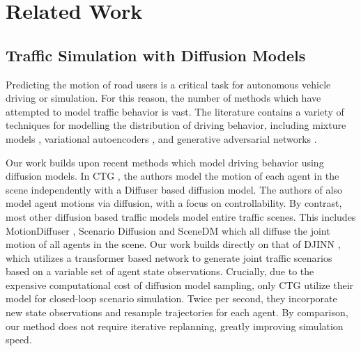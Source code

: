 \section{Related Work}
\subsection{Traffic Simulation with Diffusion Models}

Predicting the motion of road users is a critical task for autonomous vehicle driving or simulation. For this reason, the number of methods which have attempted to model traffic behavior is vast. The literature contains a variety of techniques for modelling the distribution of driving behavior, including mixture models \cite{ChaiSBA19, CuiRCLNHSD19, NayakantiAZGRS23}, variational autoencoders \cite{scibior2021imagining,suo2021trafficsim}, and generative adversarial networks \cite{zhao2019multi}. 

Our work builds upon recent methods which model driving behavior using diffusion models. In CTG \cite{zhong2023guided}, the authors model the motion of each agent in the scene independently with a Diffuser \cite{JannerDTL22} based diffusion model. The authors of \cite{chang2023controllable} also model agent motions via diffusion, with a focus on controllability. By contrast, most other diffusion based traffic models model entire traffic scenes. This includes MotionDiffuser \cite{jiang2023motiondiffuser}, Scenario Diffusion \cite{pronovost2023scenario} and SceneDM \cite{guo2023scenedm} which all diffuse the joint motion of all agents in the scene. Our work builds directly on that of DJINN \cite{niedoba2024diffusion}, which utilizes a transformer based network to generate joint traffic scenarios based on a variable set of agent state observations. Crucially, due to the expensive computational cost of diffusion model sampling, only CTG \cite{zhong2023guided} utilize their model for closed-loop scenario simulation. Twice per second, they incorporate new state observations and resample trajectories for each agent. By comparison, our method does not require iterative replanning, greatly improving simulation speed.

